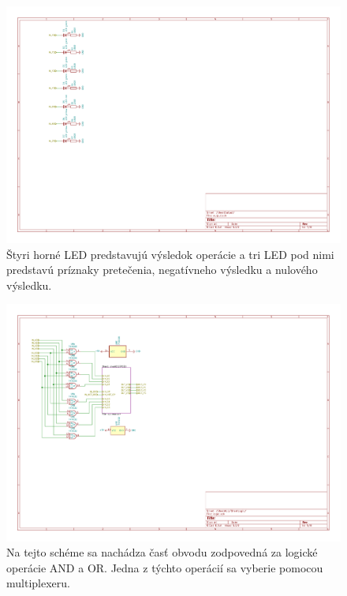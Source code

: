 \documentclass{article}
\begin{document}
    \begin{figure}[h!]
        \centering
        \includegraphics[width=.8\linewidth]{output_sheet.pdf}
        \caption{Štyri horné LED predstavujú výsledok operácie a tri LED pod nimi predstavú príznaky pretečenia, negatívneho výsledku a nulového výsledku.}
    \end{figure}


    \begin{figure}[h!]
        \centering
        \includegraphics[width=.8\linewidth]{logic_sheet.pdf}
        \caption{Na tejto schéme sa nachádza časť obvodu zodpovedná za logické operácie AND a OR. Jedna z týchto operácií sa vyberie pomocou multiplexeru.}
    \end{figure}
\end{document}
